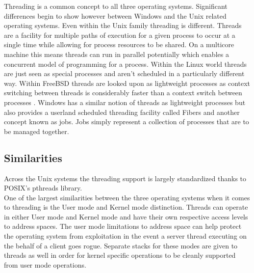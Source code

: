 \documentclass[letterpaper,10pt,draftclsnofoot,onecolumn]{IEEEtran}
\begin{document}
Threading is a common concept to all three operating systems. Significant differences begin to show however between Windows and the Unix related operating systems. Even within the Unix family threading is different. Threads are a facility for multiple paths of execution for a given process to occur at a single time while allowing for process resources to be shared. On a multicore machine this means threads can run in parallel potentially which enables a concurrent model of programming for a process. Within the Linux world threads are just seen as special processes and aren’t scheduled in a particularly different way. Within FreeBSD threads are looked upon as lightweight processes as context switching between threads is considerably faster than a context switch between processes \cite{mccusick}. Windows has a similar notion of threads as lightweight processes but also provides a userland scheduled threading facility called Fibers and another concept known as jobs. Jobs simply represent a collection of processes that are to be managed together.\\

\subsection{Similarities}
Across the Unix systems the threading support is largely standardized thanks to POSIX’s pthreads library.\\



One of the largest similarities between the three operating systems when it comes to threading is the User mode and Kernel mode distinction. Threads can operate in either User mode and Kernel mode and have their own respective access levels to address spaces. The user mode limitations to address space can help protect the operating system from exploitation in the event a server thread executing on the behalf of a client goes rogue. Separate stacks for these modes are given to threads as well in order for kernel specific operations to be cleanly supported from user mode operations.\\

\newpage
\end{document}
